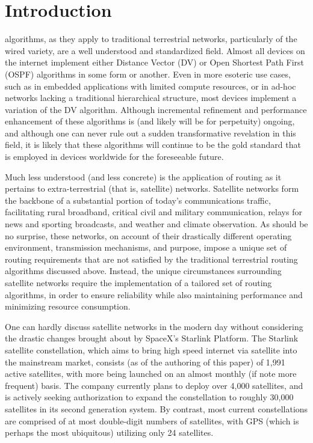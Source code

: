 \section{Introduction}\label{sec:introduction}
 algorithms, as they apply to traditional terrestrial networks, particularly of the wired variety, are a well understood and standardized field. Almost all devices on the internet implement either Distance Vector (DV) or Open Shortest Path First (OSPF) algorithms in some form or another. Even in more esoteric use cases, such as in embedded applications with limited compute resources, or in ad-hoc networks lacking a traditional hierarchical structure, most devices implement a variation of the DV algorithm. Although incremental refinement and performance enhancement of these algorithms is (and likely will be for perpetuity) ongoing, and although one can never rule out a sudden transformative revelation in this field, it is likely that these algorithms will continue to be the gold standard that is employed in devices worldwide for the foreseeable future.

Much less understood (and less concrete) is the application of routing as it pertains to extra-terrestrial (that is, satellite) networks. Satellite networks form the backbone of a substantial portion of today's communications traffic, facilitating rural broadband, critical civil and military communication, relays for news and sporting broadcasts, and weather and climate observation. As should be no surprise, these networks, on account of their drastically different operating environment, transmission mechanisms, and purpose, impose a unique set of routing requirements that are not satisfied by the traditional terrestrial routing algorithms discussed above. Instead, the unique circumstances surrounding satellite networks require the implementation of a tailored set of routing algorithms, in order to ensure reliability while also maintaining performance and minimizing resource consumption.

One can hardly discuss satellite networks in the modern day without considering the drastic changes brought about by SpaceX's Starlink Platform. The Starlink satellite constellation, which aims to bring high speed internet via satellite into the mainstream market, consists (as of the authoring of this paper) of 1,991 active satellites, with more being launched on an almost monthly (if note more frequent) basis. The company currently plans to deploy over 4,000 satellites, and is actively seeking authorization to expand the constellation to roughly 30,000 satellites in its second generation system. By contrast, most current constellations are comprised of at most double-digit numbers of satellites, with GPS (which is perhaps the most ubiquitous) utilizing only 24 satellites.

